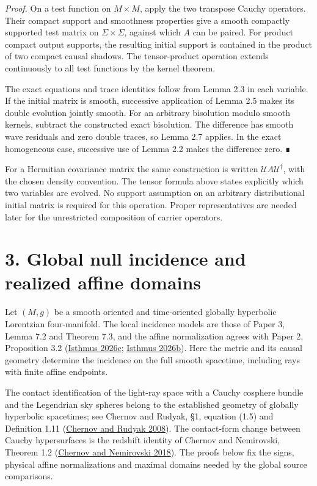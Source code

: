 \documentclass[
  english,
  11pt,
  reqno]{amsart}
\begin{document}
\emph{Proof.} On a test function on \(M\times M\), apply the two
transpose Cauchy operators. Their compact support and smoothness
properties give a smooth compactly supported test matrix on
\(\Sigma\times\Sigma\), against which \(A\) can be paired. For product
compact output supports, the resulting initial support is contained in
the product of two compact causal shadows. The tensor-product operation
extends continuously to all test functions by the kernel theorem.

The exact equations and trace identities follow from Lemma 2.3 in each
variable. If the initial matrix is smooth, successive application of
Lemma 2.5 makes its double evolution jointly smooth. For an arbitrary
bisolution modulo smooth kernels, subtract the constructed exact
bisolution. The difference has smooth wave residuals and zero double
traces, so Lemma 2.7 applies. In the exact homogeneous case, successive
use of Lemma 2.2 makes the difference zero. ∎

For a Hermitian covariance matrix the same construction is written
\(\mathcal U A\mathcal U^\dagger\), with the chosen density convention.
The tensor formula above states explicitly which two variables are
evolved. No support assumption on an arbitrary distributional initial
matrix is required for this operation. Proper representatives are needed
later for the unrestricted composition of carrier operators.

\protect{}\label{sec:global-null-incidence}

\section{3. Global null incidence and realized affine
domains}\label{global-null-incidence-and-realized-affine-domains}

Let \((M,g)\) be a smooth oriented and time-oriented globally hyperbolic
Lorentzian four-manifold. The local incidence models are those of Paper
3, Lemma 7.2 and Theorem 7.3, and the affine normalization agrees with
Paper 2, Proposition 3.2 (\hyperref[ref-IsthmusSmooth2026]{Isthmus
2026c}; \hyperref[ref-IsthmusGlobal2026]{Isthmus 2026b}). Here the
metric and its causal geometry determine the incidence on the full
smooth spacetime, including rays with finite affine endpoints.

The contact identification of the light-ray space with a Cauchy cosphere
bundle and the Legendrian sky spheres belong to the established geometry
of globally hyperbolic spacetimes; see Chernov and Rudyak, §1, equation
(1.5) and Definition 1.11 (\hyperref[ref-ChernovRudyak2008]{Chernov and
Rudyak 2008}). The contact-form change between Cauchy hypersurfaces is
the redshift identity of Chernov and Nemirovski, Theorem 1.2
(\hyperref[ref-ChernovNemirovski2018]{Chernov and Nemirovski 2018}). The
proofs below fix the signs, physical affine normalizations and maximal
domains needed by the global source comparisons.
\end{document}
